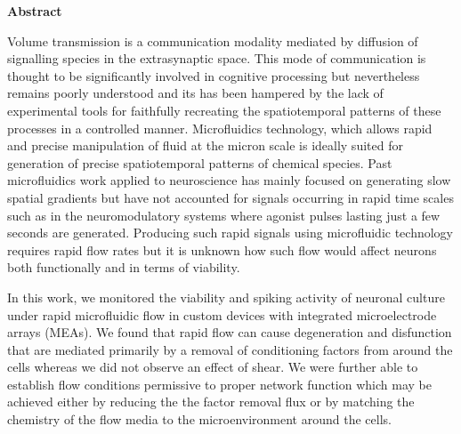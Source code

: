 \vspace*{1.5cm}

{\Huge\textbf{Abstract}}

\vspace*{1.5cm}

Volume transmission is a communication modality mediated by diffusion of signalling species in the extrasynaptic space. This mode of communication is thought to be significantly involved in cognitive processing but nevertheless remains poorly understood and its has been hampered by the lack of experimental tools for faithfully recreating the spatiotemporal patterns of these processes in a controlled manner. Microfluidics technology, which allows rapid and precise manipulation of fluid at the micron scale is ideally suited for generation of precise spatiotemporal patterns of chemical species. Past microfluidics work applied to neuroscience has mainly focused on generating slow spatial gradients but have not accounted for signals occurring in rapid time scales such as in the neuromodulatory systems where agonist pulses lasting just a few seconds are generated. Producing such rapid signals using microfluidic technology requires rapid flow rates but it is unknown how such flow would affect neurons both functionally and in terms of viability.

In this work, we monitored the viability and spiking activity of neuronal culture under rapid microfluidic flow in custom devices with integrated microelectrode arrays (MEAs). We found that rapid flow can cause degeneration and disfunction that are mediated primarily by a removal of conditioning factors from around the cells whereas we did not observe an effect of shear. We were further able to establish flow conditions permissive to proper network function which may be achieved either by reducing the the factor removal flux or by matching the chemistry of the flow media to the microenvironment around the cells.

